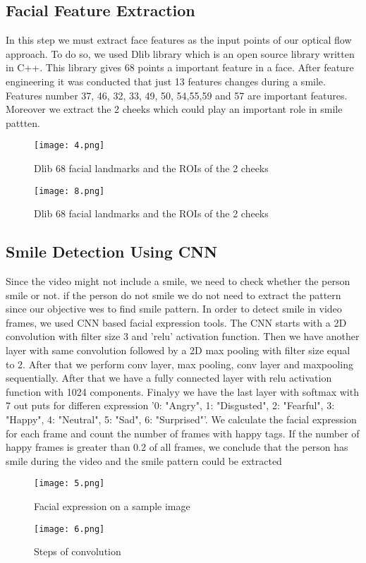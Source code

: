 \documentclass{article}
\begin{document}
{\subsection{Facial Feature Extraction}
\par{In this step we must extract face features as the input points of our optical flow approach. To do so, we used Dlib library which is an open source library written in C++. This library gives 68 points a important feature in a face. After feature engineering it was conducted that just 13 features changes during a smile. Features number 37, 46, 32, 33, 49, 50, 54,55,59 and 57 are important features. Moreover we extract the 2 cheeks which could play an important role in smile pattten. }
\begin{figure}[H]
    \centering
    \texttt{[image: 4.png]}
    \caption{Dlib 68 facial landmarks and  the ROIs of the 2 cheeks}
    \label{simulationfigure}
\end{figure}
\begin{figure}[H]
    \centering
    \texttt{[image: 8.png]}
    \caption{Dlib 68 facial landmarks and  the ROIs of the 2 cheeks}
    \label{simulationfigure}
\end{figure}



\subsection{Smile Detection Using CNN}
\par{Since the video might not include a smile, we need to check whether the person smile or not. if the person do not smile we do not need to extract the pattern since our objective wes to find smile pattern. In order to detect smile in video frames, we used CNN based facial expression tools. The CNN starts with a 2D convolution with filter size 3 and 'relu' activation function. Then we have another layer with same convolution followed by a 2D max pooling with filter size equal to 2. After that we perform conv layer, max pooling, conv layer and maxpooling sequentially. After that we have a fully connected layer with relu activation function with 1024 components. Finalyy we have the last layer with softmax with 7 out puts for differen expression '{0: "Angry", 1: "Disgusted", 2: "Fearful", 3: "Happy", 4: "Neutral", 5: "Sad", 6: "Surprised"}'. We calculate the facial expression for each frame and count the number of frames with happy tags. If the number of happy frames is greater than 0.2 of all frames, we conclude that the person has smile during the video and the smile pattern could be extracted}
\begin{figure}[H]
    \centering
    \texttt{[image: 5.png]}
    \caption{Facial expression on a sample image}
    \label{simulationfigure}
\end{figure}
\begin{figure}[H]
    \centering
    \texttt{[image: 6.png]}
    \caption{Steps of convolution}
    \label{simulationfigure}
\end{figure}

}
\end{document}
